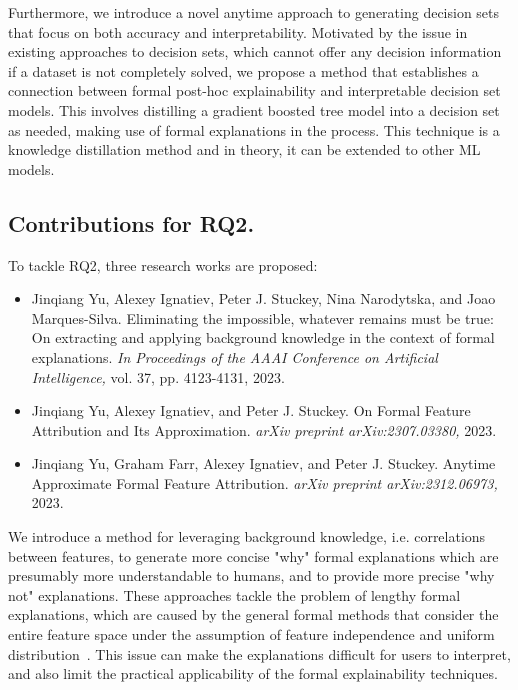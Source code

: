 Furthermore, we introduce a novel anytime approach to
generating decision sets that focus on both
accuracy and interpretability.
%
Motivated by the issue in existing approaches to decision sets,
which cannot offer any decision information 
if a dataset is not completely solved,
we propose a method that establishes a connection
between formal post-hoc explainability and interpretable decision set models.
%
This involves distilling a gradient boosted tree model 
into a decision set as needed,
making use of formal explanations in the process.
%
This technique is a knowledge distillation method and in theory, it can be extended
to other ML models.


\subsection{Contributions for RQ2.}

To tackle RQ2, three research works are proposed: 

\begin{itemize}

	\item Jinqiang Yu, Alexey Ignatiev, Peter J. Stuckey, Nina Narodytska, and Joao Marques-Silva.
Eliminating the impossible, whatever remains must be true: On extracting and applying background
knowledge in the context of formal explanations. \emph{In Proceedings of the AAAI Conference on Artificial
Intelligence,} vol. 37, pp. 4123-4131, 2023.

	\item Jinqiang Yu, Alexey Ignatiev, and Peter J. Stuckey. On Formal Feature Attribution and Its
Approximation. \emph{arXiv preprint arXiv:2307.03380,} 2023.

	\item Jinqiang Yu, Graham Farr, Alexey Ignatiev, and Peter J. Stuckey. Anytime Approximate Formal
Feature Attribution. \emph{arXiv preprint arXiv:2312.06973,} 2023.
\end{itemize}


We introduce a method for leveraging background knowledge,
i.e. correlations between features, to generate more concise "why" formal explanations
which are presumably more understandable to humans,
and to provide more precise "why not" explanations.
%
These approaches tackle the problem of lengthy formal explanations, 
which are caused by the general formal methods that consider the entire 
feature space under the assumption of feature independence and
uniform distribution~\cite{kutyniok-jair21}.
%
This issue can make the explanations difficult for users to interpret, 
and also limit the practical applicability of the formal explainability
techniques.

